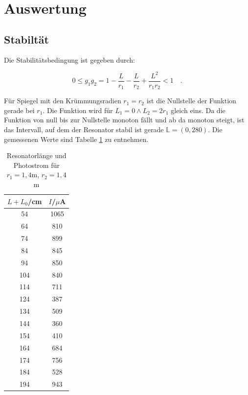 \section{Auswertung}
\subsection{Stabiltät}
Die Stabilitätsbedingung ist gegeben durch:

\begin{equation}
0\le g_1g_2=1-\frac{L}{r_1}-\frac{L}{r_2}+\frac{L^2}{r_1r_2}<1\quad.
\end{equation}

Für Spiegel mit den Krümmungsradien \(r_1=r_2\) ist die Nullstelle der Funktion gerade bei \(r_1\). Die Funktion wird für \(L_1=0\land L_2=2r_1\) gleich eins. Da die Funktion von null bis zur Nullstelle monoton fällt und ab da monoton steigt, ist das Intervall, auf dem der Resonator stabil ist gerade \(\mathbb{L}=(0,280)\). Die gemessenen Werte sind Tabelle \ref{tab:t1} zu entnehmen.

\begin{table}[H]
	\begin{center}
		\begin{tabular}{c c}
			\toprule
			\(L+L_0\)/cm & \(I\)/\(\mu\)A \\
			\midrule
			54          &    1065\\
			64            &  810\\
			74             & 899\\
			84              &845\\
			94              &850\\
			104             &840\\                                                                                    
			114             &711\\                                                                                  
			124             &387\\                                                                                
			134             &509\\                                                                              
			144             &360\\                                                                            
			154             &410\\                                                                          
			164             &684\\                                                                        
			174             &756\\                                                                      
			184             &528\\                                                                    
			194             &943\\
			\bottomrule
		\end{tabular}
		\caption{Resonatorlänge und Photostrom für \(r_1=1,4\)m, \(r_2=1,4\)m}
		\label{tab:t1}
	\end{center}
\end{table}

